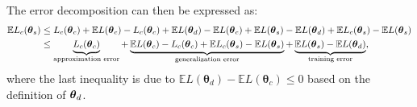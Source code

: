 The error decomposition can then be expressed as:
\begin{align}
    \mathbb{E} L_c(\boldsymbol{\theta}_s) 
    &\leq L_c(\boldsymbol{\theta}_c) + \mathbb{E} L(\boldsymbol{\theta}_c) - L_c(\boldsymbol{\theta}_c) 
    + \mathbb{E} L(\boldsymbol{\theta}_d) - \mathbb{E} L(\boldsymbol{\theta}_c) 
    + \mathbb{E} L(\boldsymbol{\theta}_s) - \mathbb{E} L(\boldsymbol{\theta}_d) 
    + \mathbb{E} L_c(\boldsymbol{\theta}_s) - \mathbb{E} L(\boldsymbol{\theta}_s) \notag \\
    &\leq \underbrace{L_c(\boldsymbol{\theta}_c)}_{\text{approximation error}}
    + \underbrace{\mathbb{E} L(\boldsymbol{\theta}_c) - L_c(\boldsymbol{\theta}_c) 
    + \mathbb{E} L_c(\boldsymbol{\theta}_s) - \mathbb{E} L(\boldsymbol{\theta}_s)}_{\text{generalization error}}
    + \underbrace{\mathbb{E} L(\boldsymbol{\theta}_s) - \mathbb{E} L(\boldsymbol{\theta}_d)}_{\text{training error}},
\end{align}where the last inequality is due to $\mathbb{E} L(\boldsymbol{\theta}_d) - \mathbb{E} L(\boldsymbol{\theta}_c) \le 0$ based on the definition of $\boldsymbol{\theta}_d$.


